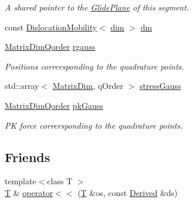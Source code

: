 \begin{DoxyCompactItemize}
\begin{DoxyCompactList}\small\item\em A shared pointer to the \hyperlink{classmodel_1_1_glide_plane}{Glide\+Plane} of this segment. \end{DoxyCompactList}\item 
const \hyperlink{classmodel_1_1_dislocation_mobility}{Dislocation\+Mobility}$<$ \hyperlink{classmodel_1_1_dislocation_segment_a10a92a3e7fa3a34303d85bd00da0de02a026f372e58773b98ecc0b1e1db99a323}{dim} $>$ \hyperlink{classmodel_1_1_dislocation_segment_a0a586fde05405666253129b2a4534f7a}{dm}
\item 
\hyperlink{classmodel_1_1_dislocation_segment_a038d9448e2a98c8da218d1dae63576e1}{Matrix\+Dim\+Qorder} \hyperlink{classmodel_1_1_dislocation_segment_ab3d7bac9e0d2027bd09fdb4ffbd7245d}{rgauss}
\begin{DoxyCompactList}\small\item\em Positions corrersponding to the quadrature points. \end{DoxyCompactList}\item 
std\+::array$<$ \hyperlink{_spline_enums_8h_ab727134c60058354c77e11b738a0891d}{Matrix\+Dim}, q\+Order $>$ \hyperlink{classmodel_1_1_dislocation_segment_a6b4c7c4a5fe56d79ff519dd0ef801767}{stress\+Gauss}
\item 
\hyperlink{classmodel_1_1_dislocation_segment_a038d9448e2a98c8da218d1dae63576e1}{Matrix\+Dim\+Qorder} \hyperlink{classmodel_1_1_dislocation_segment_ab0a6a48cf3cf304c435450caad5442d7}{pk\+Gauss}
\begin{DoxyCompactList}\small\item\em P\+K force corrersponding to the quadrature points. \end{DoxyCompactList}\end{DoxyCompactItemize}
\subsection*{Friends}
\begin{DoxyCompactItemize}
\item 
{\footnotesize template$<$class T $>$ }\\\hyperlink{_spline_node_base__corder1_8h_a82692d3a5502b91460591f1d5504314a}{T} \& \hyperlink{classmodel_1_1_dislocation_segment_abfde1a334382971fb458dba3060a420a}{operator$<$$<$} (\hyperlink{_spline_node_base__corder1_8h_a82692d3a5502b91460591f1d5504314a}{T} \&os, const \hyperlink{classmodel_1_1_dislocation_segment_a7767d69273160000e7597366ac1dc6e8}{Derived} \&ds)
\end{DoxyCompactItemize}
